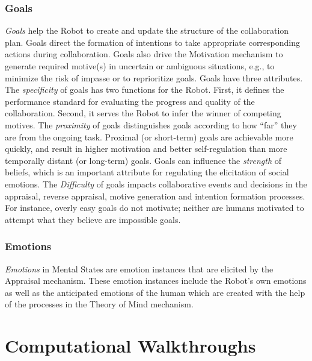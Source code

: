 \subsubsection{Goals}
\label{sec:goals}

\textit{Goals} help the Robot to create and update the structure of the
collaboration plan. Goals direct the formation of intentions to take appropriate
corresponding actions during collaboration. Goals also drive the Motivation
mechanism to generate required motive(s) in uncertain or ambiguous situations,
e.g., to minimize the risk of impasse or to reprioritize goals. Goals have
three attributes. The \textit{specificity} of goals has two functions for the
Robot. First, it defines the performance standard for evaluating the progress
and quality of the collaboration. Second, it serves the Robot to infer the
winner of competing motives. The \textit{proximity} of goals distinguishes goals
according to how ``far'' they are from the ongoing task. Proximal (or
short-term) goals are achievable more quickly, and result in higher motivation
and better self-regulation than more temporally distant (or long-term) goals.
Goals can influence the \textit{strength} of beliefs, which is an important
attribute for regulating the elicitation of social emotions. The
\textit{Difficulty} of goals impacts collaborative events and decisions in the
appraisal, reverse appraisal, motive generation and intention formation
processes. For instance, overly easy goals do not motivate; neither are humans
motivated to attempt what they believe are impossible goals.

\subsubsection{Emotions}

\textit{Emotions} in Mental States are emotion instances that are elicited by
the Appraisal mechanism. These emotion instances include the Robot's own
emotions as well as the anticipated emotions of the human which are created with
the help of the processes in the Theory of Mind mechanism.

\section{Computational Walkthroughs}
\label{sec:wtce}

